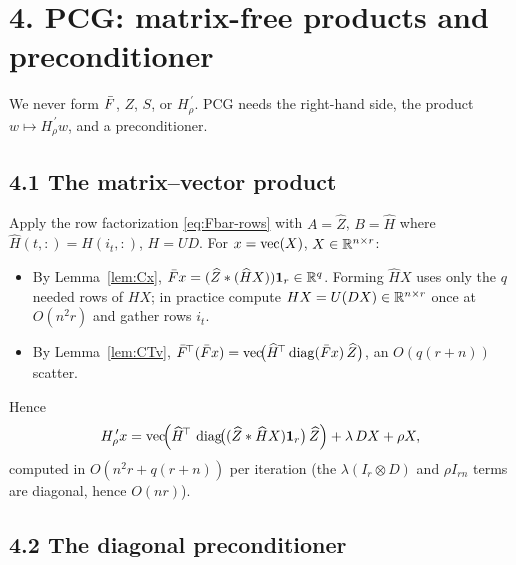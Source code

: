 \documentclass[11pt]{article}
\begin{document}
\section*{4. PCG: matrix-free products and preconditioner}

We never form $\bar F$, $Z$, $S$, or $H_\rho^{\,\prime}$. PCG needs the
right-hand side, the product $w\mapsto H_\rho^{\,\prime}w$, and a
preconditioner.

\subsection*{4.1 The matrix--vector product}

Apply the row factorization \eqref{eq:Fbar-rows} with $A=\widehat Z$,
$B=\widehat H$ where $\widehat H(t,:)=H(i_t,:)$, $H=UD$. For
$x=\operatorname{vec}(X)$, $X\in\mathbb{R}^{n\times r}$:
\begin{itemize}\setlength\itemsep{2pt}
\item By Lemma~\ref{lem:Cx}, $\bar F x=(\widehat Z\ast(\widehat H X))\mathbf 1_r\in\mathbb{R}^q$.
      Forming $\widehat H X$ uses only the $q$ needed rows of $HX$; in practice
      compute $HX=U(DX)\in\mathbb{R}^{n\times r}$ once at $O(n^2r)$ and gather rows
      $i_t$.
\item By Lemma~\ref{lem:CTv}, $\bar F^{\!\top}(\bar F x)
      =\operatorname{vec}\!\bigl(\widehat H^{\!\top}\operatorname{diag}(\bar F x)\,\widehat Z\bigr)$,
      an $O(q(r+n))$ scatter.
\end{itemize}
Hence
\begin{equation}\label{eq:matvec}
  H_\rho^{\,\prime}x
   = \operatorname{vec}\!\Bigl(\widehat H^{\!\top}\,\operatorname{diag}\!\bigl((\widehat Z\ast \widehat H X)\mathbf 1_r\bigr)\,\widehat Z\Bigr)
     + \lambda\,DX + \rho X,
\end{equation}
computed in $O(n^2r+q(r+n))$ per iteration (the $\lambda(I_r\otimes D)$ and
$\rho I_{rn}$ terms are diagonal, hence $O(nr)$).

\subsection*{4.2 The diagonal preconditioner}
\end{document}
